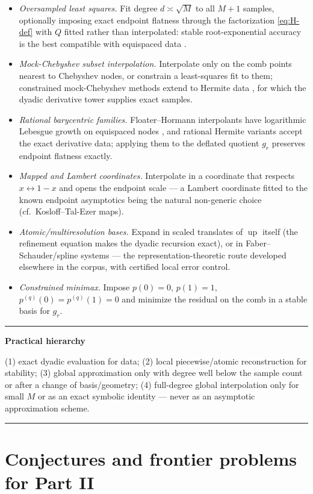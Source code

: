 \documentclass[11pt,oneside]{article}
\numberwithin{equation}{section}
\theoremstyle{definition}
\theoremstyle{remark}
\newcommand{\Up}{\operatorname{up}}
\newenvironment{statusbox}[1]{%
  \par\smallskip\noindent\begin{center}\begin{minipage}{0.94\textwidth}%
  \hrule\vspace{0.5em}\noindent\textbf{#1}\par\smallskip
}{%
  \vspace{0.5em}\hrule\end{minipage}\end{center}\smallskip
}
\begin{document}
\begin{itemize}
\item\emph{Oversampled least squares.}  Fit degree $d\asymp\sqrt M$
to all $M+1$ samples, optionally imposing exact endpoint flatness
through the factorization \eqref{eq:H-def} with $Q$ fitted rather
than interpolated: stable root-exponential accuracy is the best
compatible with equispaced data
\cite{PlatteTrefethenKuijlaars2011,AdcockShadrin2023}.
\item\emph{Mock-Chebyshev subset interpolation.}  Interpolate only on
the comb points nearest to Chebyshev nodes, or constrain a
least-squares fit to them; constrained mock-Chebyshev methods extend
to Hermite data \cite{DellAccio2025}, for which the dyadic derivative
tower supplies exact samples.
\item\emph{Rational barycentric families.}  Floater--Hormann
interpolants have logarithmic Lebesgue growth on equispaced nodes
\cite{FloaterHormann2007,CirilloHormann2019}, and rational Hermite
variants accept the exact derivative data; applying them to the
deflated quotient $g_r$ preserves endpoint flatness exactly.
\item\emph{Mapped and Lambert coordinates.}  Interpolate in a
coordinate that respects $x\leftrightarrow1-x$ and opens the
endpoint scale --- a Lambert coordinate fitted to the known endpoint
asymptotics being the natural non-generic choice
(cf.\ Kosloff--Tal-Ezer maps).
\item\emph{Atomic/multiresolution bases.}  Expand in scaled
translates of $\Up$ itself (the refinement equation makes the dyadic
recursion exact), or in Faber--Schauder/spline systems --- the
representation-theoretic route developed elsewhere in the corpus,
with certified local error control.
\item\emph{Constrained minimax.}  Impose
$p(0)=0$, $p(1)=1$, $p^{(q)}(0)=p^{(q)}(1)=0$ and minimize the
residual on the comb in a stable basis for $g_r$.
\end{itemize}

\begin{statusbox}{Practical hierarchy}
(1) exact dyadic evaluation for data;
(2) local piecewise/atomic reconstruction for stability;
(3) global approximation only with degree well below the sample count
or after a change of basis/geometry;
(4) full-degree global interpolation only for small $M$ or as an
exact symbolic identity --- never as an asymptotic approximation
scheme.
\end{statusbox}

\section{Conjectures and frontier problems for Part II}
\label{sec:conjectures-interp}
\end{document}
